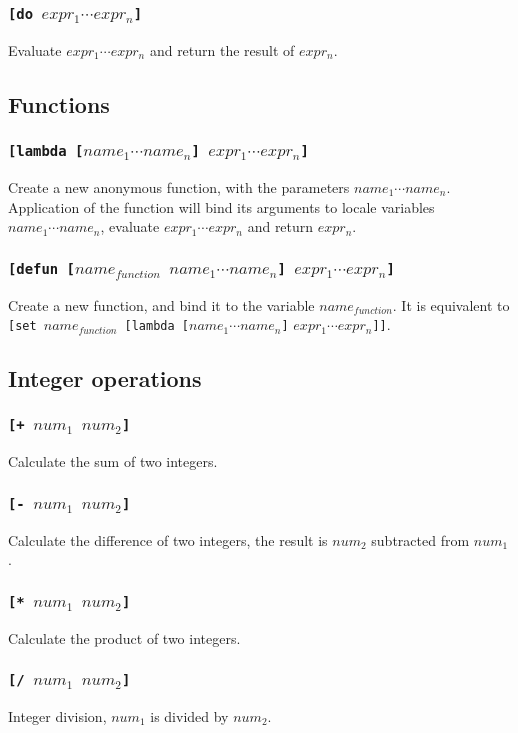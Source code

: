 \subsubsection{\tt{[do }$expr_1 \cdots expr_n$\tt{]}}
Evaluate $expr_1 \cdots expr_n$ and return the result of $expr_n$.


\subsection{Functions}
\subsubsection{\tt{[lambda [}$name_1 \cdots name_n$\tt{]} $expr_1 \cdots expr_n$\tt{]}}
Create a new anonymous function, with the parameters $name_1\cdots name_n$. Application of the function will bind its arguments to locale variables $name_1\cdots name_n$, evaluate $expr_1\cdots expr_n$ and return $expr_n$.
\subsubsection{\tt{[defun [}$name_{function}$ $name_1 \cdots name_n$\tt{]} $expr_1 \cdots expr_n$\tt{]}}
Create a new function, and bind it to the variable $name_{function}$. It is equivalent to {\tt{[set }}$name_{function}${\tt{ [lambda [}}$name_1 \cdots name_n${\tt{]}} $expr_1 \cdots expr_n${\tt{]]}}.

\subsection{Integer operations}
\subsubsection{\tt{[+ }$num_1$ $num_2$\tt{]}}
Calculate the sum of two integers.
\subsubsection{\tt{[- }$num_1$ $num_2$\tt{]}}
Calculate the difference of two integers, the result is $num_2$ subtracted from $num_1$.
\subsubsection{\tt{[* }$num_1$ $num_2$\tt{]}}
Calculate the product of two integers.
\subsubsection{\tt{[/ }$num_1$ $num_2$\tt{]}}
Integer division, $num_1$ is divided by $num_2$.
